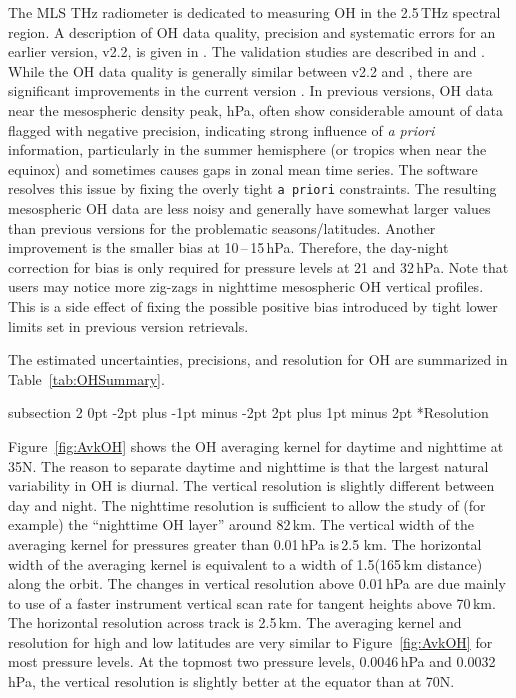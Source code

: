 \documentclass[11pt,draft]{report}
\makeatletter
\renewcommand{\subsection}{\@startsection%
  {subsection}%
  {2}%
  {0pt}%
  {-2pt plus -1pt minus -2pt}%
  {2pt plus 1pt minus 2pt}%
  {\large\sffamily\fontseries{sb}\selectfont\flushleft\color{SectionColor}\figureversion{tabular}}}%
\makeatother
\begin{document}
The MLS THz radiometer is dedicated to measuring OH in the 2.5\,THz
spectral region. A description of OH data quality, precision and
systematic errors for an earlier version, v2.2, is given in
\citet{PickettEtal08}. The validation studies are described in
\citet{PickettEtal08} and \citet{WangEtal08}. While the OH data quality
is generally similar between v2.2 and \prevv, there are significant
improvements in the current version \thisv. In previous versions, OH
data near the mesospheric density peak,  hPa, often
show considerable amount of data flagged with negative precision,
indicating strong influence of \emph{a priori} information, particularly
in the summer hemisphere (or tropics when near the equinox) and
sometimes causes gaps in zonal mean time series. The \thisv software
resolves this issue by fixing the overly tight \texttt{a priori}
constraints. The resulting mesospheric OH data are less noisy and
generally have somewhat larger values than previous versions for the
problematic seasons/latitudes. Another improvement is the smaller bias
at 10\,--\,15\,hPa. Therefore, the day-night correction for bias is only
required for pressure levels at 21 and 32\,hPa. Note that users may
notice more zig-zags in \thisv nighttime mesospheric OH vertical
profiles. This is a side effect of fixing the possible positive bias
introduced by tight lower limits set in previous version retrievals.

The estimated uncertainties, precisions, and resolution for \thisv OH are
summarized in Table~\ref{tab:OHSummary}.

\subsection*{Resolution}

Figure~\ref{fig:AvkOH} shows the OH averaging kernel for daytime and
nighttime at 35\degsym N. The reason to separate daytime and nighttime
is that the largest natural variability in OH is diurnal. The vertical
resolution is slightly different between day and night. The nighttime
resolution is sufficient to allow the study of (for example) the
``nighttime OH layer'' around 82\,km.  The vertical width of the
averaging kernel for pressures greater than 0.01\,hPa is\,2.5 km.  The
horizontal width of the averaging kernel is equivalent to a width of
1.5\degsym (165\,km distance) along the orbit.  The changes in vertical
resolution above 0.01\,hPa are due mainly to use of a faster instrument
vertical scan rate for tangent heights above 70\,km.  The horizontal
resolution across track is 2.5\,km. The averaging kernel and resolution
for high and low latitudes are very similar to Figure~\ref{fig:AvkOH}
for most pressure levels.  At the topmost two pressure levels,
0.0046\,hPa and 0.0032\,hPa, the vertical resolution is slightly better
at the equator than at 70\degsym N.
\end{document}
